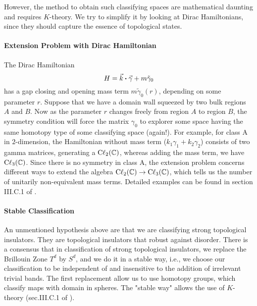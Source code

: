 \documentclass{article}
\begin{document}
However, the method to obtain such classifying spaces are mathematical daunting
and requires $K$-theory. We try to simplify it by looking at Dirac Hamiltonians,
since they should capture the essence of topological states.

\paragraph{Extension Problem with Dirac Hamiltonian}
The Dirac Hamiltonian
\begin{equation}
    H = \vec{k}\vdot \vec{\gamma} + m\tilde{\gamma}_0
\end{equation}
has a gap closing and opening mass term $m\tilde{\gamma}_0(r)$, depending on some
parameter $r$. Suppose that we have a domain wall squeezed by two bulk regions
$A$ and $B$. Now as the parameter $r$ changes freely from region $A$ to region
$B$, the symmetry condition will force the matrix $\gamma_0$ to explorer some
space having the same homotopy type of some classifying space (again!). For
example, for class $\mathrm{A}$ in $2$-dimension, the Hamiltonian without mass
term ($k_1\gamma_1 + k_2\gamma_2$) consists of two gamma matrices, generating a
$\mathrm{C\ell}_{2}(\mathbb{C})$, whereas adding the mass term, we have
$\mathrm{C\ell}_{3}(\mathbb{C})$. Since there is no symmetry in class $\mathrm{A}$, the
extension problem concerns different ways to extend the algebra
$\mathrm{C\ell}_{2}(\mathbb{C})\to \mathrm{C\ell}_{3}(\mathbb{C})$, which tells us the number of
unitarily non-equivalent mass terms. Detailed examples can be found in section
III.C.1 of \cite{Chiu2016}.

\paragraph{Stable Classification} An unmentioned hypothesis above are that we
are classifying strong topological insulators. They are topological insulators
that robust against disorder\cite{Fu2007}. There is a consensus that in
classification of strong topological insulators, we replace the Brillouin Zone
$T^d$ by $S^d$\cite{Kennedy2015}, and we do it in a stable way, i.e., we choose
our classification to be independent of and insensitive to the addition of
irrelevant trivial bands. The first replacement allow us to use homotopy groups,
which classify maps with domain in spheres. The "stable way" allows the use of
$K$-theory (sec.III.C.1 of \cite{Chiu2016}).
\end{document}
